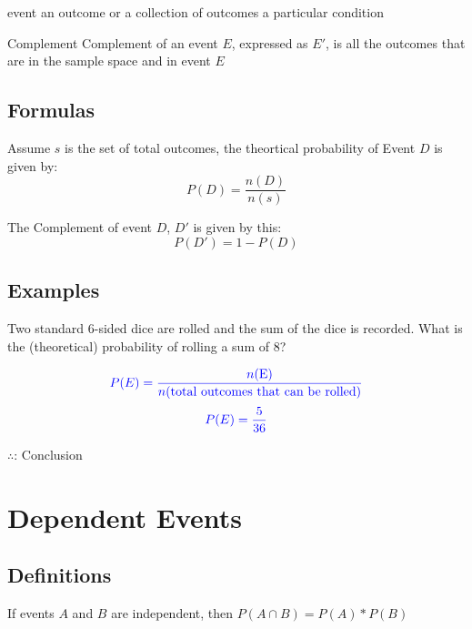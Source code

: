 \begin{cyanblock} 
    \begin{worddef}{event}
        an outcome or a collection of outcomes  a particular condition
    \end{worddef}
\end{cyanblock}

\begin{cyanblock} 
    \begin{worddef}{Complement}
        Complement of an event $E$, expressed as $E'$, is all the outcomes that are in the sample space and  in event $E$
    \end{worddef}
\end{cyanblock}

\subsection{Formulas}
Assume $s$ is the set of total outcomes, the theortical probability of Event $D$ is given by:
\[
    P(D) = \frac{n(D)}{n(s)}
\]

The Complement of event $D$, $D'$ is given by this:
\[
    P(D') = 1 - P(D)
\]

\subsection{Examples}
\begin{redblock}
    \begin{example}
        Two standard 6-sided dice are rolled and the sum of the dice is recorded. What is the (theoretical) probability of
rolling a sum of 8?
        \begin{center}
            \[
                \textcolor{blue}{P(E) = \frac{n(\text{E})}{n(\text{total outcomes that can be rolled})}}
            \]
            \[
                \textcolor{blue}{P(E) = \frac{5}{36}}
            \]
        \end{center}
        $\therefore$: Conclusion
    \end{example}
\end{redblock}

\section{Dependent Events}
\subsection{Definitions}
\begin{definition}
If events $A$ and $B$ are independent, then $P(A\cap B) = P(A) * P(B)$\\
\end{definition}

